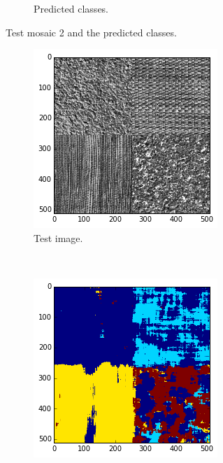 \documentclass[a4paper]{article}
\begin{document}
\begin{figure}
\begin{subfigure}[b]{0.23\textwidth}
        \caption{%
            Predicted classes.
        }
    \end{subfigure}
    \caption{%
        Test mosaic 2 and the predicted classes.
    }
    \label{fig:test2}
\end{figure}

\begin{figure}
    \centering
    \begin{subfigure}[b]{0.23\textwidth}
        \centering
        \includegraphics[width=\textwidth]{mosaic3_test.png}
        \caption{%
            Test image.
        }
    \end{subfigure}
    ~
    \begin{subfigure}[b]{0.23\textwidth}
        \centering
        \includegraphics[width=\textwidth]{mosaic3_pred.png}

\end{subfigure}
\end{figure}
\end{document}

